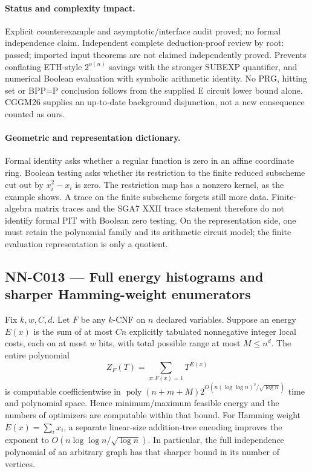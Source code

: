 \paragraph{Status and complexity impact.}
Explicit counterexample and asymptotic/interface audit proved; no formal independence claim. Independent complete deduction-proof review by root: passed; imported input theorems are not claimed independently proved. Prevents conflating ETH-style $2^{o(n)}$ savings with the stronger SUBEXP quantifier, and numerical Boolean evaluation with symbolic arithmetic identity. No PRG, hitting set or BPP=P conclusion follows from the supplied E circuit lower bound alone. CGGM26 supplies an up-to-date background disjunction, not a new consequence counted as ours.

\paragraph{Geometric and representation dictionary.}
Formal identity asks whether a regular function is zero in an affine coordinate ring. Boolean testing asks whether its restriction to the finite reduced subscheme cut out by $x_i^2-x_i$ is zero. The restriction map has a nonzero kernel, as the example shows. A trace on the finite subscheme forgets still more data. Finite-algebra matrix traces and the SGA7 XXII trace statement therefore do not identify formal PIT with Boolean zero testing. On the representation side, one must retain the polynomial family and its arithmetic circuit model; the finite evaluation representation is only a quotient.

\subsection{NN-C013 --- Full energy histograms and sharper Hamming-weight enumerators}
\begin{proposition}[NN-C013]
Fix $k,w,C,d$. Let $F$ be any $k$-CNF on $n$ declared variables. Suppose an energy $E(x)$ is the sum of at most $Cn$ explicitly tabulated nonnegative integer local costs, each on at most $w$ bits, with total possible range at most $M\leq n^d$. The entire polynomial
\[
 Z_F(T)=\sum_{x:F(x)=1}T^{E(x)}
\]
is computable coefficientwise in $\operatorname{poly}(n+m+M)2^{O(n(\log\log n)^2/\sqrt{\log n})}$ time and polynomial space. Hence minimum/maximum feasible energy and the numbers of optimizers are computable within that bound. For Hamming weight $E(x)=\sum_i x_i$, a separate linear-size addition-tree encoding improves the exponent to $O(n\log\log n/\sqrt{\log n})$. In particular, the full independence polynomial of an arbitrary graph has that sharper bound in its number of vertices.
\end{proposition}
